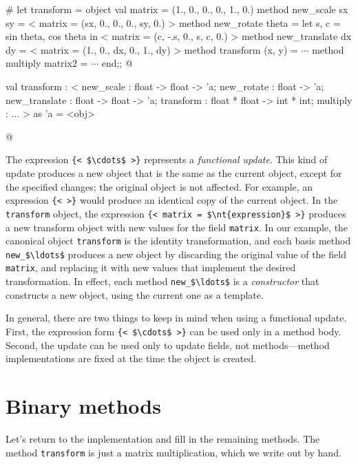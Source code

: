 \begin{ocaml}
# let transform =
object
   val matrix = (1., 0., 0., 0., 1., 0.)
   method new_scale sx sy =
      {< matrix = (sx, 0., 0., 0., sy, 0.) >}
   method new_rotate theta =
      let s, c = sin theta, cos theta in
      {< matrix = (c, -.s, 0., s, c, 0.) >}
   method new_translate dx dy =
      {< matrix = (1., 0., dx, 0., 1., dy) >}
   method transform (x, y) = $\cdots$
   method multiply matrix2 = $\cdots$
end;;
@
\begin{topoutput}
val transform :
  < new_scale : float -> float -> 'a;
    new_rotate : float -> 'a;
    new_translate : float -> float -> 'a;
    transform : float * float -> int * int;
    multiply : ... > as 'a = <obj>
\end{topoutput}
@
\end{ocaml}
%
\label{keyword:functional-object-update}
The expression \hbox{\lstinline/{< $\cdots$ >}/} represents a \emph{functional update}.  This kind
of update produces a new object that is the same as the current object, except for the specified
changes; the original object is not affected.  For example, an expression \hbox{\lstinline/{< >}/} would
produce an identical copy of the current object.  In the \hbox{\lstinline/transform/} object, the
expression \hbox{\lstinline/{< matrix = $\nt{expression}$ >}/} produces a new transform object with new
values for the field \hbox{\lstinline/matrix/}.  In our example, the canonical object \hbox{\lstinline/transform/}
is the identity transformation, and each basis method \hbox{\lstinline/new_$\ldots$/} produces a new object
by discarding the original value of the field \hbox{\lstinline/matrix/}, and replacing it with new values
that implement the desired transformation.  In effect, each method \hbox{\lstinline/new_$\ldots$/} is
a \emph{constructor} that constructs a new object, using the current one as a template.

In general, there are two things to keep in mind when using a functional update.  First, the
expression form \hbox{\lstinline/{< $\cdots$ >}/} can be used only in a method body.  Second, the update
can be used only to update fields, not methods---method implementations are fixed at the time the
object is created.

\section{Binary methods}

Let's return to the implementation and fill in the remaining methods.  The
method \hbox{\lstinline/transform/} is just a matrix multiplication, which we write out by hand.

